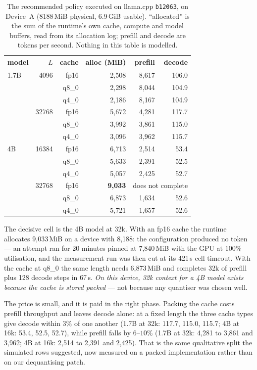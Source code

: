 \documentclass[5p]{elsarticle}
\begin{document}
\begin{table}[t]
\caption{The recommended policy executed on llama.cpp \texttt{b12063}, on
Device~A (8188\,MiB physical, 6.9\,GiB usable). ``allocated'' is the sum of the
runtime's own cache, compute and model buffers, read from its allocation log;
prefill and decode are tokens per second. Nothing in this table is modelled.}
\label{tab:exec}
\begin{tabular}{@{}lrrrrr@{}}
\toprule
model & $L$ & cache & alloc (MiB) & prefill & decode \\
\midrule
1.7B & 4096  & fp16  & 2{,}508 & 8{,}617 & 106.0 \\
     &       & q8\_0 & 2{,}298 & 8{,}044 & 104.9 \\
     &       & q4\_0 & 2{,}186 & 8{,}167 & 104.9 \\
\addlinespace
     & 32768 & fp16  & 5{,}672 & 4{,}281 & 117.7 \\
     &       & q8\_0 & 3{,}992 & 3{,}861 & 115.0 \\
     &       & q4\_0 & 3{,}096 & 3{,}962 & 115.7 \\
\midrule
4B   & 16384 & fp16  & 6{,}713 & 2{,}514 & 53.4 \\
     &       & q8\_0 & 5{,}633 & 2{,}391 & 52.5 \\
     &       & q4\_0 & 5{,}057 & 2{,}425 & 52.7 \\
\addlinespace
     & 32768 & fp16  & \textbf{9{,}033} & \multicolumn{2}{c}{does not complete} \\
     &       & q8\_0 & 6{,}873 & 1{,}634 & 52.6 \\
     &       & q4\_0 & 5{,}721 & 1{,}657 & 52.6 \\
\bottomrule
\end{tabular}
\end{table}

The decisive cell is the 4B model at 32k. With an fp16 cache the runtime allocates
9{,}033\,MiB on a device with 8{,}188: the configuration produced no token --- an
attempt ran for 20 minutes pinned at 7{,}840\,MiB with the GPU at $100\%$
utilisation, and the measurement run was then cut at its 421\,s cell timeout.
With the cache at q8\_0 the same length needs 6{,}873\,MiB and completes 32k of
prefill plus 128 decode steps in 67\,s. \emph{On this device, 32k context for a 4B
model exists because the cache is stored packed} --- not because any quantiser was
chosen well.

The price is small, and it is paid in the right phase. Packing the cache costs
prefill throughput and leaves decode alone: at a fixed length the three cache types
give decode within $3\%$ of one another (1.7B at 32k: 117.7, 115.0, 115.7; 4B at
16k: 53.4, 52.5, 52.7), while prefill falls by $6$--$10\%$ (1.7B at 32k: 4{,}281
to 3{,}861 and 3{,}962; 4B at 16k: 2{,}514 to 2{,}391 and 2{,}425). That is the
same qualitative split the simulated rows suggested, now measured on a packed
implementation rather than on our dequantising patch.
\end{document}
